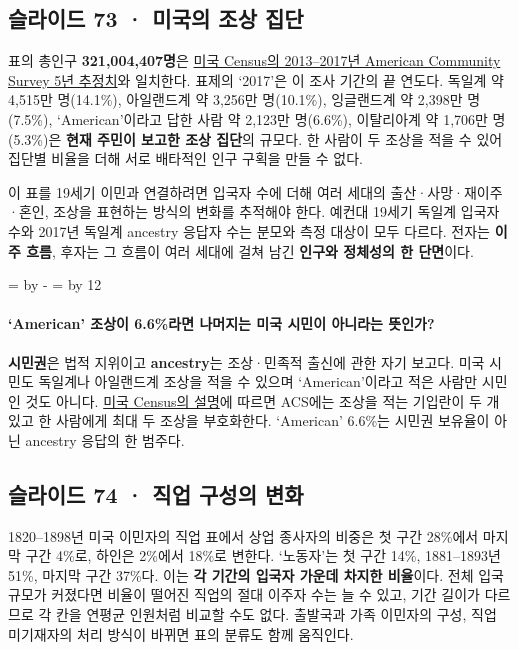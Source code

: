 \documentclass[10pt,a4paper]{article}
\newcommand{\ReserveQuestionSpace}{%
  \par\begingroup
  \dimen0=\pagegoal \advance\dimen0 by -\pagetotal
  \dimen2=\baselineskip \multiply\dimen2 by 12
  \ifdim\dimen0<\dimen2 \newpage\fi
  \endgroup}
\begin{document}
\subsection{슬라이드 73 · 미국의 조상 집단}
표의 총인구 \textbf{321,004,407명}은 \href{https://data.census.gov/table/ACSDT5Y2017.B04007}{미국 Census의 2013–2017년 American Community Survey 5년 추정치}와 일치한다. 표제의 ‘2017’은 이 조사 기간의 끝 연도다. 독일계 약 4,515만 명(14.1\%), 아일랜드계 약 3,256만 명(10.1\%), 잉글랜드계 약 2,398만 명(7.5\%), ‘American’이라고 답한 사람 약 2,123만 명(6.6\%), 이탈리아계 약 1,706만 명(5.3\%)은 \textbf{현재 주민이 보고한 조상 집단}의 규모다. 한 사람이 두 조상을 적을 수 있어 집단별 비율을 더해 서로 배타적인 인구 구획을 만들 수 없다.\par

이 표를 19세기 이민과 연결하려면 입국자 수에 더해 여러 세대의 출산·사망·재이주·혼인, 조상을 표현하는 방식의 변화를 추적해야 한다. 예컨대 19세기 독일계 입국자 수와 2017년 독일계 ancestry 응답자 수는 분모와 측정 대상이 모두 다르다. 전자는 \textbf{이주 흐름}, 후자는 그 흐름이 여러 세대에 걸쳐 남긴 \textbf{인구와 정체성의 한 단면}이다.\par

\ReserveQuestionSpace
\paragraph{‘American’ 조상이 6.6\%라면 나머지는 미국 시민이 아니라는 뜻인가?}

\textbf{시민권}은 법적 지위이고 \textbf{ancestry}는 조상·민족적 출신에 관한 자기 보고다. 미국 시민도 독일계나 아일랜드계 조상을 적을 수 있으며 ‘American’이라고 적은 사람만 시민인 것도 아니다. \href{https://www.census.gov/topics/population/ancestry/about/faq.html}{미국 Census의 설명}에 따르면 ACS에는 조상을 적는 기입란이 두 개 있고 한 사람에게 최대 두 조상을 부호화한다. ‘American’ 6.6\%는 시민권 보유율이 아닌 ancestry 응답의 한 범주다.\par

\subsection{슬라이드 74 · 직업 구성의 변화}
1820–1898년 미국 이민자의 직업 표에서 상업 종사자의 비중은 첫 구간 28\%에서 마지막 구간 4\%로, 하인은 2\%에서 18\%로 변한다. ‘노동자’는 첫 구간 14\%, 1881–1893년 51\%, 마지막 구간 37\%다. 이는 \textbf{각 기간의 입국자 가운데 차지한 비율}이다. 전체 입국 규모가 커졌다면 비율이 떨어진 직업의 절대 이주자 수는 늘 수 있고, 기간 길이가 다르므로 각 칸을 연평균 인원처럼 비교할 수도 없다. 출발국과 가족 이민자의 구성, 직업 미기재자의 처리 방식이 바뀌면 표의 분류도 함께 움직인다.\par
\end{document}
